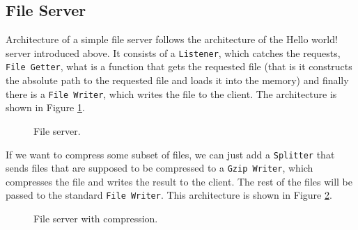 \subsection{File Server}
\label{sec:fileServer}
Architecture of a simple file server follows the architecture of the Hello world!
server introduced above. It consists of a \texttt{Listener}, which catches the requests,
\texttt{File Getter}, what is a function that gets the requested file (that is it
constructs the absolute path to the requested file and loads it into the memory) 
and finally there is a \texttt{File Writer}, which
writes the file to the client. The architecture is shown in Figure \ref{fig:fileServer}.
\begin{figure}[h]
\centering
{}
\caption[scale=1.0]{File server.}
\label{fig:fileServer}
\end{figure}

If we want to compress some subset of files, we can just add a \texttt{Splitter}
that sends files that are supposed to be compressed to a \texttt{Gzip Writer}, which
compresses the file and writes the result to the client. The rest of the files
will be passed to the standard \texttt{File Writer}. This architecture is shown in
Figure \ref{fig:fileServer2}.

\begin{figure}[h]
\centering
{}
\caption[scale=1.0]{File server with compression.}
\label{fig:fileServer2}
\end{figure}

